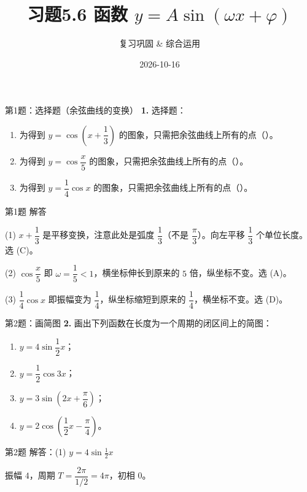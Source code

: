 \documentclass[10pt,aspectratio=169,serif]{beamer}
\title[习题5.6]{习题5.6 函数 $y=A\sin(\omega x+\varphi)$}
\subtitle{复习巩固 \& 综合运用}
\author{}
\institute{}
\date{2026-10-16}
\begin{document}
\begin{frame}
  \titlepage
\end{frame}

\begin{frame}[t]{第1题：选择题（余弦曲线的变换）}
\textbf{1.} 选择题：
\begin{enumerate}
  \item 为得到 $y=\cos\!\left(x+\dfrac13\right)$ 的图象，只需把余弦曲线上所有的点（\quad）。
  \item 为得到 $y=\cos\dfrac{x}{5}$ 的图象，只需把余弦曲线上所有的点（\quad）。
  \item 为得到 $y=\dfrac14\cos x$ 的图象，只需把余弦曲线上所有的点（\quad）。
\end{enumerate}
\end{frame}

\begin{frame}[t]{第1题 解答}
\begin{tcolorbox}[colback=orange!10,colframe=orange,title=\textbf{解}]
(1) $x+\dfrac13$ 是平移变换，注意此处是弧度 $\dfrac13$（不是 $\dfrac{\pi}{3}$）。向左平移 $\dfrac13$ 个单位长度。\alert{选 (C)}。

(2) $\cos\dfrac{x}{5}$ 即 $\omega=\dfrac15<1$，横坐标伸长到原来的 $5$ 倍，纵坐标不变。\alert{选 (A)}。

(3) $\dfrac14\cos x$ 即振幅变为 $\dfrac14$，纵坐标缩短到原来的 $\dfrac14$，横坐标不变。\alert{选 (D)}。
\end{tcolorbox}
\end{frame}

\begin{frame}[t]{第2题：画简图}
\textbf{2.} 画出下列函数在长度为一个周期的闭区间上的简图：
\begin{enumerate}
  \item $y=4\sin\dfrac12 x$；\qquad
  \item $y=\dfrac12\cos 3x$；
  \item $y=3\sin\!\left(2x+\dfrac{\pi}{6}\right)$；\qquad
  \item $y=2\cos\!\left(\dfrac12 x-\dfrac{\pi}{4}\right)$。
\end{enumerate}
\end{frame}

\begin{frame}[t]{第2题 解答：(1) $y=4\sin\frac12 x$}
\begin{tcolorbox}[colback=orange!10,colframe=orange,title=\textbf{解}]
振幅 $4$，周期 $T=\dfrac{2\pi}{1/2}=4\pi$，初相 $0$。
\end{tcolorbox}
\begin{center}
\end{center}
\end{frame}
\end{document}
